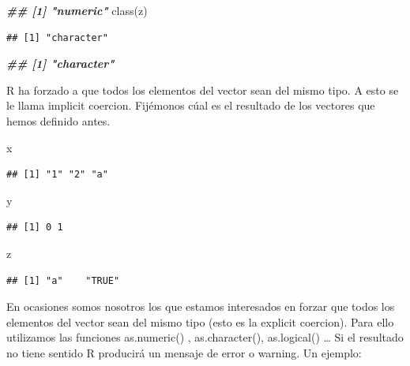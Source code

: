 \documentclass[
]{book}
\newenvironment{Shaded}{\begin{snugshade}}{\end{snugshade}}
\newcommand{\DocumentationTok}[1]{\textcolor[rgb]{0.56,0.35,0.01}{\textbf{\textit{#1}}}}
\newcommand{\FunctionTok}[1]{\textcolor[rgb]{0.00,0.00,0.00}{#1}}
\newcommand{\NormalTok}[1]{#1}
\begin{document}
\begin{Shaded}
\begin{Highlighting}[]
\DocumentationTok{\#\# [1] "numeric"}
\FunctionTok{class}\NormalTok{(z)}
\end{Highlighting}
\end{Shaded}

\begin{verbatim}
## [1] "character"
\end{verbatim}

\begin{Shaded}
\begin{Highlighting}[]
\DocumentationTok{\#\# [1] "character"}
\end{Highlighting}
\end{Shaded}

R ha forzado a que todos los elementos del vector sean del mismo tipo. A esto se le llama implicit coercion. Fijémonos cúal es el resultado de los vectores que hemos definido antes.

\begin{Shaded}
\begin{Highlighting}[]
\NormalTok{x}
\end{Highlighting}
\end{Shaded}

\begin{verbatim}
## [1] "1" "2" "a"
\end{verbatim}

\begin{Shaded}
\begin{Highlighting}[]
\NormalTok{y}
\end{Highlighting}
\end{Shaded}

\begin{verbatim}
## [1] 0 1
\end{verbatim}

\begin{Shaded}
\begin{Highlighting}[]
\NormalTok{z}
\end{Highlighting}
\end{Shaded}

\begin{verbatim}
## [1] "a"    "TRUE"
\end{verbatim}

En ocasiones somos nosotros los que estamos interesados en forzar que todos los elementos del vector sean del mismo tipo (esto es la explicit coercion). Para ello utilizamos las funciones as.numeric() , as.character(), as.logical() \ldots{} Si el resultado no tiene sentido R producirá un mensaje de error o warning. Un ejemplo:
\end{document}
